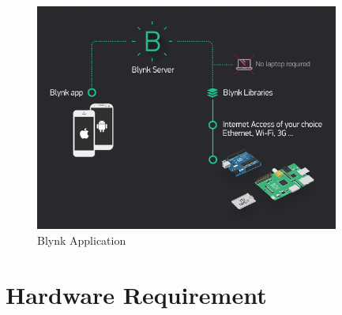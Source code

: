 \documentclass[twoside,a4paper,16pt]{book}
\begin{document}
{{			\begin{figure}[ht!]
				\begin{center}
					\includegraphics[width=10.0cm]{blynk2.png}
					\caption{Blynk Application}
				\end{center}
			\end{figure}
			\chapter{Hardware Requirement}
}}
\end{document}
